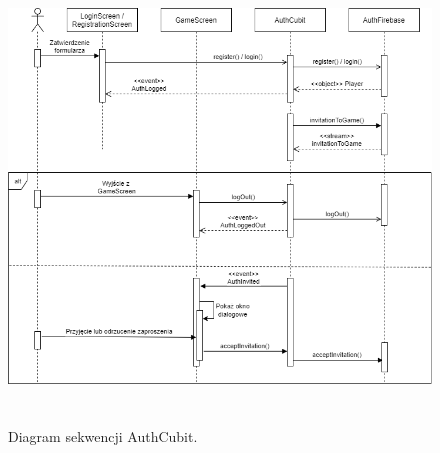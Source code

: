 \begin{figure}[h!]
	\begin{center}
		\includegraphics[width=16cm,height=12cm]{img/diagram-sekwencji-auth.png}
	\end{center}
	\caption{{\color{dgray}Diagram sekwencji AuthCubit.}} 
	\label{AuthCubit}
\end{figure}  

